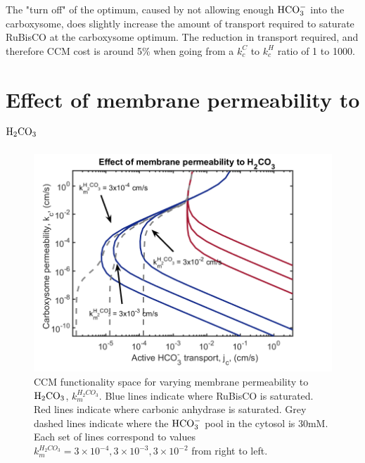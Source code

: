 \documentclass[]{article}
\begin{document}
The "turn off" of the optimum, caused by not allowing enough ${\rm HCO_3^-}$ into the carboxysome, does slightly increase the amount of transport required to saturate RuBisCO at the carboxysome optimum. The reduction in transport required, and therefore CCM cost is around 5\% when going from a $k_c^C$ to $k_c^H$ ratio of 1 to 1000.


%

\section{Effect of membrane permeability to ${\rm H_2CO_3}$}

\begin{figure}[h!]
	\includegraphics[width = \textwidth]{H2CO3permeability_jckc.png}
	\caption{CCM functionality space for varying membrane permeability to ${\rm H_2CO_3}$, $ k_m^{H_2CO_3}$. Blue lines indicate where RuBisCO is saturated. Red lines indicate where carbonic anhydrase is saturated. Grey dashed lines indicate where the ${\rm HCO_3^-}$ pool in the cytosol is 30mM. Each set of lines correspond to values  $ k_m^{H_2CO_3} = 3\times 10^{-4}, 3\times 10^{-3}, 3\times 10^{-2}$ from right to left.}
\end{figure}
\end{document}
